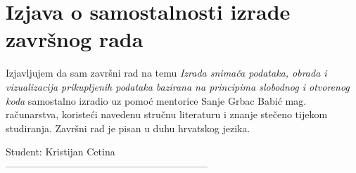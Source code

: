 \section*{Izjava o samostalnosti izrade završnog rada}
Izjavljujem da sam završni rad na temu \emph{Izrada snimača podataka, obrada i vizualizacija prikupljenih podataka bazirana na principima slobodnog i otvorenog koda} samostalno izradio uz pomoć mentorice Sanje Grbac Babić mag. računarstva, koristeći navedenu stručnu literaturu i znanje stečeno tijekom studiranja.
Završni rad je pisan u duhu hrvatskog jezika.
\vspace{\fill}
\begin{flushright}
Student: Kristijan Cetina\\
\vspace{15mm}
--------------------------------------------------------------
\end{flushright}